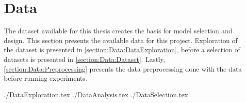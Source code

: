 \chapter{Data}
\label{section:Data}




The dataset available for this thesis creates the basis for model selection and design.
This section presents the available data for this project.
Exploration of the dataset is presented in \cref{section:Data:DataExploration},
before a selection of datasets is presented in \cref{section:Data:Dataset}.
Lastly, \cref{section:Data:Preprocessing} presents the data preprocessing done with the data before running experiments.

{./DataExploration.tex}
{./DataAnalysis.tex}
{./DataSelection.tex}

